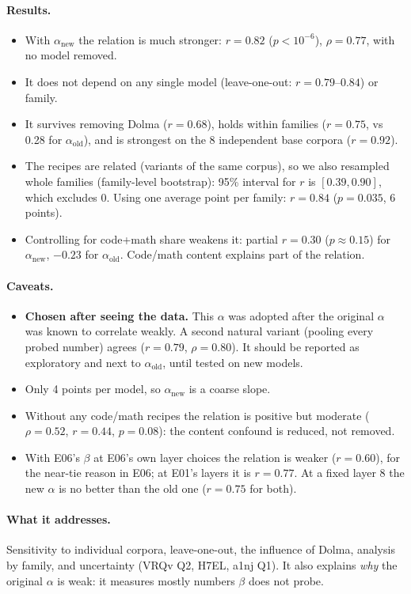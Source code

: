 \documentclass[11pt]{article}
\newcommand{\aold}{\alpha_{\text{old}}}
\newcommand{\anew}{\alpha_{\text{new}}}
\begin{document}
\paragraph{Results.}
\begin{itemize}
\item With $\anew$ the relation is much stronger: $r = 0.82$ ($p<10^{-6}$), $\rho = 0.77$, with no model
  removed.
\item It does not depend on any single model (leave-one-out: $r = 0.79$--$0.84$) or family.
\item It survives removing Dolma ($r=0.68$), holds within families ($r=0.75$, vs 0.28 for $\aold$), and
  is strongest on the 8 independent base corpora ($r=0.92$).
\item The recipes are related (variants of the same corpus), so we also resampled whole families
  (family-level bootstrap): 95\% interval for $r$ is $[0.39, 0.90]$, which excludes 0. Using one
  average point per family: $r = 0.84$ ($p=0.035$, 6 points).
\item Controlling for code+math share weakens it: partial $r = 0.30$ ($p \approx 0.15$) for $\anew$,
  $-0.23$ for $\aold$. Code/math content explains part of the relation.
\end{itemize}

\paragraph{Caveats.}
\begin{itemize}
\item \textbf{Chosen after seeing the data.} This $\alpha$ was adopted after the original $\alpha$ was known to correlate weakly. A second natural variant
  (pooling every probed number) agrees ($r=0.79$, $\rho=0.80$). It should be reported as exploratory
  and next to $\aold$, until tested on new models.
\item Only 4 points per model, so $\anew$ is a coarse slope.
\item Without any code/math recipes the relation is positive but moderate ($\rho = 0.52$, $r = 0.44$,
  $p = 0.08$): the content confound is reduced, not removed.
\item With E06's $\beta$ at E06's own layer choices the relation is weaker ($r=0.60$), for the near-tie
  reason in E06; at E01's layers it is $r=0.77$. At a fixed layer 8 the new $\alpha$ is no better than the
  old one ($r=0.75$ for both).
\end{itemize}

\paragraph{What it addresses.} Sensitivity to individual corpora, leave-one-out, the influence of
Dolma, analysis by family, and uncertainty (VRQv Q2, H7EL, a1nj Q1). It also explains \emph{why} the
original $\alpha$ is weak: it measures mostly numbers $\beta$ does not probe.
\end{document}
